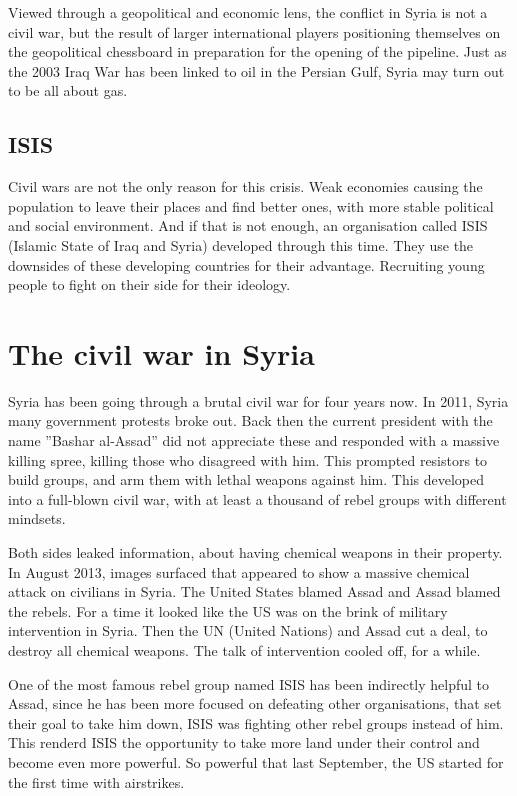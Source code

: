 Viewed through a geopolitical and economic lens, the conflict in Syria is not a civil war, but the result of larger international players positioning themselves on the geopolitical chessboard in preparation for the opening of the pipeline.
Just as the 2003 Iraq War has been linked to oil in the Persian Gulf, Syria may turn out to be all about gas.


\subsection{ISIS}
Civil wars are not the only reason for this crisis. Weak economies causing the population to leave their places and find better ones, with more stable political and social environment. And if that is not enough, an organisation called ISIS (Islamic State of Iraq and Syria) developed through this time. They use the downsides of these developing countries for their advantage. Recruiting young people to fight on their side for their ideology.

\section{The civil war in Syria}

Syria has been going through a brutal civil war for four years now. In 2011, Syria many government protests broke out.
Back then the current president with the name ''Bashar al-Assad'' did not appreciate these and responded with a massive killing spree, killing those who disagreed with him. This prompted resistors to build groups, and arm them with lethal weapons against him. This developed into a full-blown civil war, with at least a thousand of rebel groups with different mindsets.

Both sides leaked information, about having chemical weapons in their property. In August 2013, images surfaced that appeared to show a massive chemical attack on civilians in Syria. The United States blamed Assad and Assad blamed the rebels.
For a time it looked like the US was on the brink of military intervention in Syria. Then the UN (United Nations) and Assad cut a deal, to destroy all chemical weapons. The talk of intervention cooled off, for a while.

One of the most famous rebel group named ISIS has been indirectly helpful to Assad, since he has been more focused on defeating other organisations, that set their goal to take him down, ISIS was fighting other rebel groups instead of him.
This renderd ISIS the opportunity to take more land under their control and become even more powerful. So powerful that last September, the US started for the first time with airstrikes.

